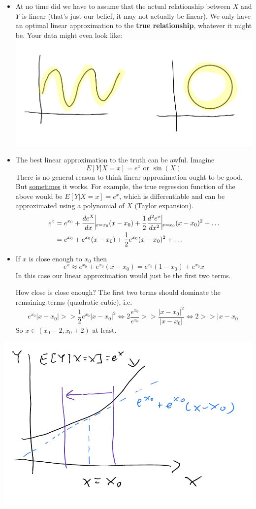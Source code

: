 \documentclass[12 pt]{article}
\begin{document}
\begin{itemize}
\item At no time did we have to assume that the actual relationship
  between $X$ and $Y$ is linear (that's just our belief, it may not
  actually be linear). We only have an optimal linear approximation to
  the \textbf{true relationship}, whatever it might be. Your data
  might even look like:
  \includegraphics[width=.9\textwidth]{4.pdf}
\item The best linear approximation to the truth can be awful. Imagine
  $$E[Y | X = x] = e^x \text{ or } \sin(X)$$
  There is no general reason to think linear approximation ought to be
  good. But \underline{sometimes} it works. For example, the true
  regression function of the above would be $E[Y | X = x] = e^x$,
  which is differentiable and can be approximated using a polynomial
  of $X$ (Taylor expansion).
  \begin{align*}
    e^x & = e^{x_0}+ \frac{de^X}{dx} \vline_{x = x_0}(x - x_0) + \frac{1}{2} \frac{d^2e^x}{dx^2}\vline_{x = x_0} (x-x_0)^2 + \ldots
    \\ & = e^{x_0} + e^{x_0}(x-x_0) + \frac{1}{2}e^{x_0}(x-x_0)^2 + \ldots
  \end{align*}
\item If $x$ is close enough to $x_0$ then $$e^x \approx e^{x_0} +
  e^{x_0}(x-x_0) = e^{x_0} (1- x_0) + e^{x_0}x$$
  In this case our linear approximation would just be the first two
  terms.

  How close is close enough? The first two terms should dominate the
  remaining terms (quadratic cubic), i.e.
  $$e^{x_0} |x - x_0| >> \frac{1}{2} e^{x_0} |x - x_0|^2 \iff 2
  \frac{e^{x_0}}{e^{x_0}} >> \frac{|x-x_0|^2}{|x-x_0|} \iff 2 >> |x -
  x_0|$$
  So $x \in (x_0 - 2, x_0 + 2)$ at least.
\end{itemize}
\includegraphics[width=.9\textwidth]{5.pdf}
\end{document}
